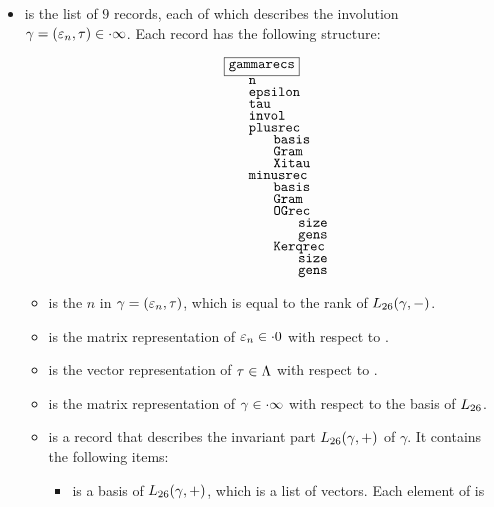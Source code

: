 \documentclass{amsart} %
\newcommand{\ttbox}[1]{\makebox[0pt][l]{{\tt #1}}}
\newcommand{\ttfbox}[1]{\makebox[0pt][l]{\fbox{\tt #1}}}
\newcommand{\pt}{p{.2cm}}
\begin{document}
\begin{itemize}
%
\item {} is the list of $9$ records,
each of which describes the involution $\gamma=(\varepsilon_n, \tau)\in \cdot \infty$.
Each record  has the following structure:
\par
\[
{
\renewcommand{\arraystretch}{.7}
\begin{tabular}{\pt \pt \pt \pt}
\ttfbox{gammarecs} &&& \\
& \ttbox{n} && \\
& \ttbox{epsilon} && \\
& \ttbox{tau} && \\
& \ttbox{invol} && \\
%
& \ttbox{plusrec} && \\
&& \ttbox{basis} & \\
&& \ttbox{Gram} & \\
&& \ttbox{Xitau} & \\
%
& \ttbox{minusrec} && \\
&& \ttbox{basis} & \\
&& \ttbox{Gram} & \\
&& \ttbox{OGrec} & \\
&&& \ttbox{size}  \\
&&& \ttbox{gens}  \\
&& \ttbox{Kerqrec} & \\
&&& \ttbox{size}  \\
&&& \ttbox{gens}  \\
\end{tabular}
}
\]
%
%
\begin{itemize}
%
\item {} is the $n$ in $\gamma=(\varepsilon_n, \tau)$,
which is  equal to the rank of $L_{26} (\gamma, -)$.
%
\item
{} is the matrix representation of $\varepsilon_n\in \cdot 0$
with respect to .
%
\item 
{} is the vector representation of $\tau\in \Lambda$
with respect to .
%
\item {} is the matrix representation of  $\gamma\in \cdot \infty$
with respect to the basis   of $L_{26}$.
%
\item {}  
is a record that describes the invariant part $L_{26}(\gamma, +)$ of $\gamma$.
It contains the following items:
%
\begin{itemize}
\item {}
is a basis of $L_{26}(\gamma, +)$,
which is a list of  vectors.
Each element of  is 

\end{itemize}
\end{itemize}
\end{itemize}
\end{document}
